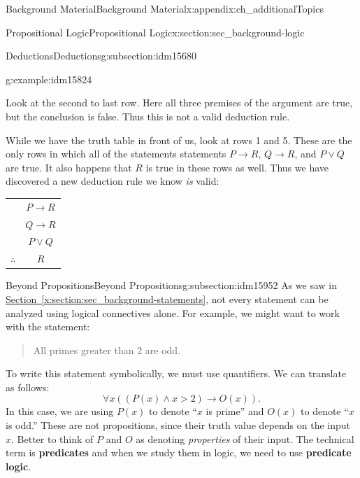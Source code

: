 \documentclass[oneside,10pt,]{book}
\newcommand{\terminology}[1]{\textbf{#1}}
\numberwithin{equation}{chapter}
\newcommand{\hrulethin}  {\noalign{\hrule height 0.04em}}
\def\imp{\rightarrow}
\newcommand{\gt}{>}
\begin{document}
\begin{appendixptx}{Background Material}{}{Background Material}{}{}{x:appendix:ch_additionalTopics}
\begin{sectionptx}{Propositional Logic}{}{Propositional Logic}{}{}{x:section:sec_background-logic}
\begin{subsectionptx}{Deductions}{}{Deductions}{}{}{g:subsection:idm15680}
\begin{example}{}{g:example:idm15824}
\begin{sidebyside}{1}{0}{0}{0}
\begin{sbspanel}{1}
\end{sbspanel}%
\end{sidebyside}%
\par
Look at the second to last row.  Here all three premises of the argument are true, but the conclusion is false.  Thus this is not a valid deduction rule.%
\par
While we have the truth table in front of us, look at rows 1 and 5.  These are the only rows in which all of the statements statements \(P \imp R\), \(Q \imp R\), and \(P\vee Q\) are true.  It also happens that \(R\) is true in these rows as well.  Thus we have discovered a new deduction rule we know \emph{is} valid:%
\begin{sidebyside}{1}{0}{0}{0}%
\begin{sbspanel}{1}%
{\centering%
\begin{tabular}{cc}
&\(P \imp R\)\tabularnewline[0pt]
&\(Q \imp R\)\tabularnewline[0pt]
&\(P \vee Q\)\tabularnewline\hrulethin
\(\therefore\)&\(R\)
\end{tabular}
\par}
\end{sbspanel}%
\end{sidebyside}%
\end{example}
\end{subsectionptx}
%
%
\typeout{************************************************}
\typeout{************************************************}
%
\begin{subsectionptx}{Beyond Propositions}{}{Beyond Propositions}{}{}{g:subsection:idm15952}
As we saw in \hyperref[x:section:sec_background-statements]{Section~\ref{x:section:sec_background-statements}}, not every statement can be analyzed using logical connectives alone.  For example, we might want to work with the statement:%
\begin{quote}%
All primes greater than 2 are odd.%
\end{quote}
To write this statement symbolically, we must use quantifiers.  We can translate as follows:%
\begin{equation*}
\forall x ((P(x) \wedge x \gt 2) \imp O(x)).
\end{equation*}
In this case, we are using \(P(x)\) to denote ``\(x\) is prime'' and \(O(x)\) to denote ``\(x\) is odd.''  These are not propositions, since their truth value depends on the input \(x\).  Better to think of \(P\) and \(O\) as denoting \emph{properties} of their input.  The technical term is \terminology{predicates} and when we study them in logic, we need to use \terminology{predicate logic}.%

\end{subsectionptx}
\end{sectionptx}
\end{appendixptx}
\end{document}
